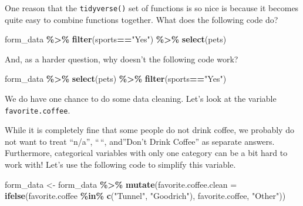 \documentclass[
]{article}
\newenvironment{Shaded}{\begin{snugshade}}{\end{snugshade}}
\newcommand{\AttributeTok}[1]{\textcolor[rgb]{0.13,0.29,0.53}{#1}}
\newcommand{\FunctionTok}[1]{\textcolor[rgb]{0.13,0.29,0.53}{\textbf{#1}}}
\newcommand{\NormalTok}[1]{#1}
\newcommand{\OtherTok}[1]{\textcolor[rgb]{0.56,0.35,0.01}{#1}}
\newcommand{\SpecialCharTok}[1]{\textcolor[rgb]{0.81,0.36,0.00}{\textbf{#1}}}
\newcommand{\StringTok}[1]{\textcolor[rgb]{0.31,0.60,0.02}{#1}}
\begin{document}
One reason that the \texttt{tidyverse()} set of functions is so nice is
because it becomes quite easy to combine functions together. What does
the following code do?

\begin{Shaded}
\begin{Highlighting}[]
\NormalTok{form\_data }\SpecialCharTok{\%\textgreater{}\%} \FunctionTok{filter}\NormalTok{(sports}\SpecialCharTok{==}\StringTok{"Yes"}\NormalTok{) }\SpecialCharTok{\%\textgreater{}\%} \FunctionTok{select}\NormalTok{(pets)}
\end{Highlighting}
\end{Shaded}

And, as a harder question, why doesn't the following code work?

\begin{Shaded}
\begin{Highlighting}[]
\NormalTok{form\_data }\SpecialCharTok{\%\textgreater{}\%} \FunctionTok{select}\NormalTok{(pets) }\SpecialCharTok{\%\textgreater{}\%} \FunctionTok{filter}\NormalTok{(sports}\SpecialCharTok{==}\StringTok{"Yes"}\NormalTok{)}
\end{Highlighting}
\end{Shaded}

We do have one chance to do some data cleaning. Let's look at the
variable \texttt{favorite.coffee}.

\begin{Shaded}
\end{Shaded}

While it is completely fine that some people do not drink coffee, we
probably do not want to treat ``n/a'', ``\,``, and''Don't Drink Coffee''
as separate answers. Furthermore, categorical variables with only one
category can be a bit hard to work with! Let's use the following code to
simplify this variable.

\begin{Shaded}
\begin{Highlighting}[]
\NormalTok{form\_data }\OtherTok{\textless{}{-}}\NormalTok{ form\_data }\SpecialCharTok{\%\textgreater{}\%} \FunctionTok{mutate}\NormalTok{(}\AttributeTok{favorite.coffee.clean =} \FunctionTok{ifelse}\NormalTok{(favorite.coffee }\SpecialCharTok{\%in\%} \FunctionTok{c}\NormalTok{(}\StringTok{"Tunnel"}\NormalTok{, }\StringTok{"Goodrich"}\NormalTok{), favorite.coffee, }\StringTok{"Other"}\NormalTok{))}
\end{Highlighting}
\end{Shaded}
\end{document}
